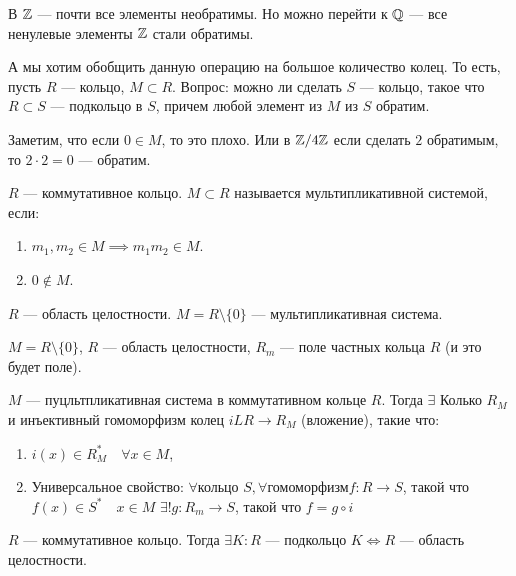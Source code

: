 В $\mathbb{Z}$ --- почти все элементы необратимы. Но можно перейти к  $\mathbb{Q}$ --- все ненулевые элементы  $\mathbb{Z}$ стали обратимы.

А мы хотим обобщить данную операцию на большое количество колец. То есть, пусть  $R$ --- кольцо,  $M \subset R$. Вопрос: можно ли сделать  $S$ --- кольцо, такое что  $R \subset S$ --- подкольцо в  $S$, причем любой элемент из  $M$ из  $S$ обратим.  

Заметим, что если $0 \in M$, то это плохо. Или в  $\mathbb{Z} / 4\mathbb{Z}$ если сделать $2$ обратимым, то  $2 \cdot 2 = 0$ --- обратим. 

\begin{definition}
    $R$ --- коммутативное кольцо.  $M \subset R$ называется мультипликативной системой, если:
     \begin{enumerate}
         \item $m_1, m_2 \in M \implies m_1m_2 \in M$.
         \item $0 \notin M$.
    \end{enumerate}
\end{definition}
\begin{example}
    $R$ --- область целостности.  $M = R \setminus \{0\}$ --- мультипликативная система.
\end{example}
\begin{definition}
    $M = R \setminus \{ 0\}$,  $R$ --- область целостности,  $R_m$ --- поле частных кольца  $R$ (и это будет поле).
\end{definition}
\begin{theorem}
    $M$ --- пуцльтпликативная система в коммутативном кольце  $R$. Тогда  $\exists$ Колько  $R_M$ и инъективный гомоморфизм колец  $i\!L R \to R_M$ (вложение), такие что:
     \begin{enumerate}
         \item $i(x) \in R^*_M \quad \forall x \in M$,
         \item  Универсальное свойство:  $\forall \text{кольцо } S, \forall \text{гомоморфизм} f\!: R \to S$, такой что  $f(x) \in S^* \quad x \in M$  $\exists! g\!: R_m \to S$, такой что  $f = g \circ i$
    \end{enumerate}
\end{theorem}
\begin{remark}
    $R$ --- коммутативное кольцо. Тогда  $\exists K\!: R$ --- подкольцо  $K \iff R$ ---  область целостности.
\end{remark}

